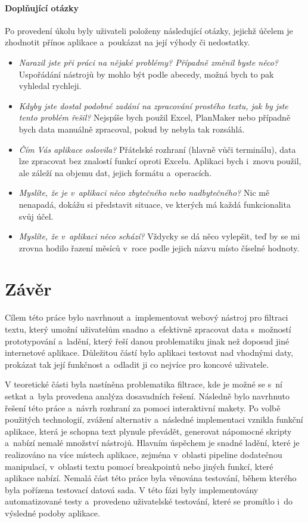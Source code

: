 \subsubsection{Doplňující otázky}
Po provedení úkolu byly uživateli položeny následující otázky, jejichž účelem je zhodnotit přínos aplikace a~poukázat na její výhody či nedostatky.
\begin{itemize}
    \item \textit{Narazil jste při práci na nějaké problémy? Případně změnil byste něco?} Uspořádání nástrojů by mohlo být podle abecedy, možná bych to pak vyhledal rychleji.
    \item \textit{Kdyby jste dostal podobné zadání na zpracování prostého textu, jak by jste tento problém řešil?} Nejspíše bych použil Excel, PlanMaker nebo případně bych data manuálně zpracoval, pokud by nebyla tak rozsáhlá.
    \item \textit{Čím Vás aplikace oslovila?} Přátelské rozhraní (hlavně vůči terminálu), data lze zpracovat bez znalostí funkcí oproti Excelu. Aplikaci bych i~znovu použil, ale záleží na objemu dat, jejich formátu a~operacích.
    \item \textit{Myslíte, že je v~aplikaci něco zbytečného nebo nadbytečného?} Nic mě nenapadá, dokážu si představit situace, ve kterých má každá funkcionalita svůj účel.
    \item \textit{Myslíte, že v~aplikaci něco schází?} Vždycky se dá něco vylepšit, teď by se mi zrovna hodilo řazení měsíců v~roce podle jejich názvu místo číselné hodnoty.
\end{itemize}

\chapter{Závěr}
Cílem této práce bylo navrhnout a~implementovat webový nástroj pro filtraci textu, který umožní uživatelům snadno a~efektivně zpracovat data s~možností prototypování a~ladění, který řeší danou problematiku jinak než doposud jiné internetové aplikace. Důležitou částí bylo aplikaci testovat nad vhodnými daty, prokázat tak její funkčnost a~odladit ji co nejvíce pro koncové uživatele.

V teoretické části byla nastíněna problematika filtrace, kde je možné se s~ní setkat a~byla provedena analýza dosavadních řešení. Následně bylo navrhnuto řešení této práce a~návrh rozhraní za pomoci interaktivní makety. Po volbě použitých technologií, zvážení alternativ a~následné implementaci vznikla funkční aplikace, která je schopna text plynule převádět, generovat nápomocné skripty a~nabízí nemalé množství nástrojů. Hlavním úspěchem je snadné ladění, které je realizováno na více místech aplikace, zejména v~oblasti pipeline dodatečnou manipulací, v~oblasti textu pomocí breakpointů nebo jiných funkcí, které aplikace nabízí. Nemalá část této práce byla věnována testování, během kterého byla pořízena testovací datová sada. V této fázi byly implementovány automatizované testy a~provedeno uživatelské testování, které se promítlo i~do výsledné podoby aplikace.

